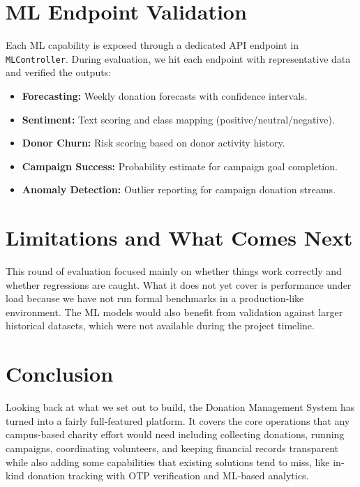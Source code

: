 \documentclass{thesis-library}
\begin{document}
\section{ML Endpoint Validation}
Each ML capability is exposed through a dedicated API endpoint in \texttt{MLController}. During evaluation, we hit each endpoint with representative data and verified the outputs:
\begin{itemize}
    \item \textbf{Forecasting:} Weekly donation forecasts with confidence intervals.
    \item \textbf{Sentiment:} Text scoring and class mapping (positive/neutral/negative).
    \item \textbf{Donor Churn:} Risk scoring based on donor activity history.
    \item \textbf{Campaign Success:} Probability estimate for campaign goal completion.
    \item \textbf{Anomaly Detection:} Outlier reporting for campaign donation streams.
\end{itemize}

\section{Limitations and What Comes Next}
This round of evaluation focused mainly on whether things work correctly and whether regressions are caught. What it does not yet cover is performance under load because we have not run formal benchmarks in a production-like environment. The ML models would also benefit from validation against larger historical datasets, which were not available during the project timeline.


\section{Conclusion}

Looking back at what we set out to build, the Donation Management System has turned into a fairly full-featured platform. It covers the core operations that any campus-based charity effort would need including collecting donations, running campaigns, coordinating volunteers, and keeping financial records transparent while also adding some capabilities that existing solutions tend to miss, like in-kind donation tracking with OTP verification and ML-based analytics.
\end{document}
